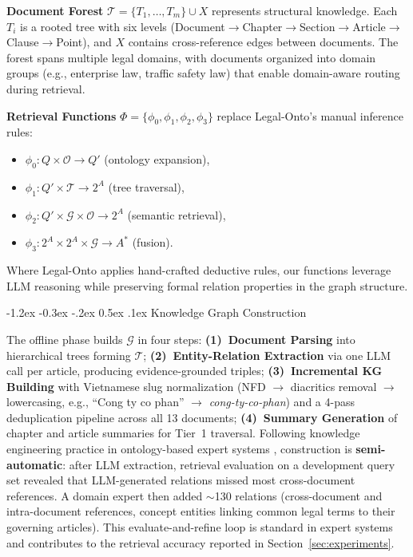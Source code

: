 \documentclass{IOS-Book-Article}
\makeatletter
\renewcommand\subsection{\@startsection{subsection}{2}{\z@}%
  {-1.2ex \@plus -0.3ex \@minus -.2ex}%
  {0.5ex \@plus .1ex}%
  {\normalfont\normalsize\bfseries}}
\makeatother
\begin{document}
\textbf{Document Forest} $\mathcal{T} = \{T_1, \ldots, T_m\} \cup X$ represents structural knowledge. Each $T_i$ is a rooted tree with six levels (Document${}\to{}$\allowbreak Chapter${}\to{}$\allowbreak Section${}\to{}$\allowbreak Article${}\to{}$\allowbreak Clause${}\to{}$\allowbreak Point), and $X$ contains cross-reference edges between documents. The forest spans multiple legal domains, with documents organized into domain groups (e.g., enterprise law, traffic safety law) that enable domain-aware routing during retrieval.

\textbf{Retrieval Functions} $\Phi = \{\phi_0, \phi_1, \phi_2, \phi_3\}$ replace Legal-Onto's manual inference rules:
\begin{itemize}[nosep,leftmargin=1.5em]
\item $\phi_0\colon Q \times \mathcal{O} \to Q'$ (ontology expansion),
\item $\phi_1\colon Q' \times \mathcal{T} \to 2^A$ (tree traversal),
\item $\phi_2\colon Q' \times \mathcal{G} \times \mathcal{O} \to 2^A$ (semantic retrieval),
\item $\phi_3\colon 2^A \times 2^A \times \mathcal{G} \to A^*$ (fusion).
\end{itemize}
Where Legal-Onto applies hand-crafted deductive rules, our functions leverage LLM reasoning while preserving formal relation properties in the graph structure.

\subsection{Knowledge Graph Construction}

The offline phase builds $\mathcal{G}$ in four steps: \textbf{(1)~Document Parsing} into hierarchical trees forming $\mathcal{T}$; \textbf{(2)~Entity-Relation Extraction} via one LLM call per article, producing evidence-grounded triples; \textbf{(3)~Incremental KG Building} with Vietnamese slug normalization (NFD $\to$ diacritics removal $\to$ lowercasing, e.g., ``Cong ty co phan'' $\to$ \textit{cong-ty-co-phan}) and a 4-pass deduplication pipeline across all 13 documents; \textbf{(4)~Summary Generation} of chapter and article summaries for Tier~1 traversal. Following knowledge engineering practice in ontology-based expert systems \cite{r9}, construction is \textbf{semi-automatic}: after LLM extraction, retrieval evaluation on a development query set revealed that LLM-generated relations missed most cross-document references. A domain expert then added $\sim$130 relations (cross-document and intra-document references, concept entities linking common legal terms to their governing articles). This evaluate-and-refine loop is standard in expert systems and contributes to the retrieval accuracy reported in Section~\ref{sec:experiments}.
\end{document}
